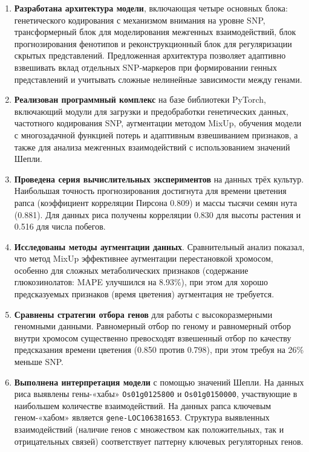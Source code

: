 \begin{enumerate}
	\item \textbf{Разработана архитектура модели}, включающая четыре 
	основных блока: генетического кодирования с механизмом внимания 
	на уровне SNP, трансформерный блок для моделирования межгенных 
	взаимодействий, блок прогнозирования фенотипов и реконструкционный 
	блок для регуляризации скрытых представлений. Предложенная 
	архитектура позволяет адаптивно взвешивать вклад отдельных 
	SNP-маркеров при формировании генных представлений и учитывать 
	сложные нелинейные зависимости между генами.
	
	\item \textbf{Реализован программный комплекс} на базе библиотеки 
	PyTorch, включающий модули для загрузки и предобработки генетических 
	данных, частотного кодирования SNP, аугментации методом MixUp, 
	обучения модели с многозадачной функцией потерь и адаптивным 
	взвешиванием признаков, а также для анализа межгенных взаимодействий 
	с использованием значений Шепли.
	
	\item \textbf{Проведена серия вычислительных экспериментов} 
	на данных трёх культур. Наибольшая точность прогнозирования 
	достигнута для времени цветения рапса (коэффициент корреляции 
	Пирсона 0.809) и массы тысячи семян нута (0.881). Для данных 
	риса получены корреляции 0.830 для высоты растения и 0.516 
	для числа побегов.
	
	\item \textbf{Исследованы методы аугментации данных}. Сравнительный 
	анализ показал, что метод MixUp эффективнее аугментации перестановкой 
	хромосом, особенно для сложных метаболических признаков (содержание 
	глюкозинолатов: MAPE улучшился на 8.93\%), при этом для хорошо 
	предсказуемых признаков (время цветения) аугментация не требуется.
	
	\item \textbf{Сравнены стратегии отбора генов} для работы с 
	высокоразмерными геномными данными. Равномерный отбор по геному 
	и равномерный отбор внутри хромосом существенно превосходят 
	взвешенный отбор по качеству предсказания времени цветения 
	(0.850 против 0.798), при этом требуя на 26\% меньше SNP.
	
	\item \textbf{Выполнена интерпретация модели} с помощью значений 
	Шепли. На данных риса выявлены гены-«хабы» \texttt{Os01g0125800} 
	и \texttt{Os01g0150000}, участвующие в наибольшем количестве 
	взаимодействий. На данных рапса ключевым геном-«хабом» является 
	\texttt{gene-LOC106381653}. Структура выявленных взаимодействий 
	(наличие генов с множеством как положительных, так и отрицательных 
	связей) соответствует паттерну ключевых регуляторных генов.
\end{enumerate}

